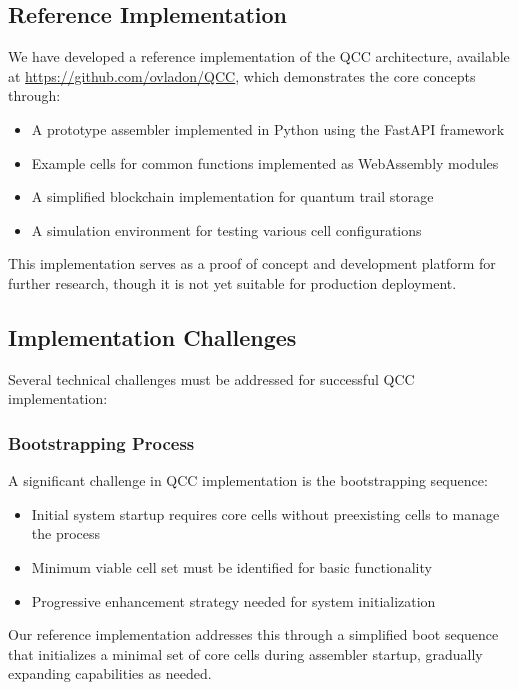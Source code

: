 \documentclass[11pt,a4paper]{article}
\begin{document}
\subsection{Reference Implementation}

We have developed a reference implementation of the QCC architecture, available at \url{https://github.com/ovladon/QCC}, which demonstrates the core concepts through:

\begin{itemize}
    \item A prototype assembler implemented in Python using the FastAPI framework
    \item Example cells for common functions implemented as WebAssembly modules
    \item A simplified blockchain implementation for quantum trail storage
    \item A simulation environment for testing various cell configurations
\end{itemize}

This implementation serves as a proof of concept and development platform for further research, though it is not yet suitable for production deployment.

\subsection{Implementation Challenges}

Several technical challenges must be addressed for successful QCC implementation:

\subsubsection{Bootstrapping Process}

A significant challenge in QCC implementation is the bootstrapping sequence:

\begin{itemize}
    \item Initial system startup requires core cells without preexisting cells to manage the process
    \item Minimum viable cell set must be identified for basic functionality
    \item Progressive enhancement strategy needed for system initialization
\end{itemize}

Our reference implementation addresses this through a simplified boot sequence that initializes a minimal set of core cells during assembler startup, gradually expanding capabilities as needed.
\end{document}
